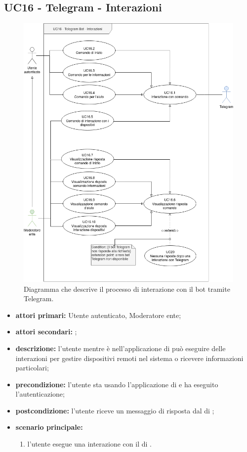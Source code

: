 \subsection{UC16 - Telegram - Interazioni}
		
	\begin{figure}[H]
		\centering
		\includegraphics[scale=0.60]{res/images/uc16}
		\caption{Diagramma che descrive il processo di interazione con il bot tramite Telegram.}
	\end{figure}
		
	\begin{itemize}
		\item \textbf{attori primari:} Utente autenticato, Moderatore ente;
		\item \textbf{attori secondari:} ;
		\item \textbf{descrizione:} l'utente mentre è nell'applicazione di  può eseguire delle interazioni per gestire dispositivi remoti nel sistema o ricevere informazioni particolari;
		\item \textbf{precondizione:} l'utente sta usando l'applicazione di  e ha eseguito l'autenticazione;
		\item \textbf{postcondizione:} l'utente riceve un messaggio di risposta dal  di ;
		\item \textbf{scenario principale:}
		\begin{enumerate}
			\item l'utente esegue una interazione con il  di .
		\end{enumerate}
	\end{itemize}
	
